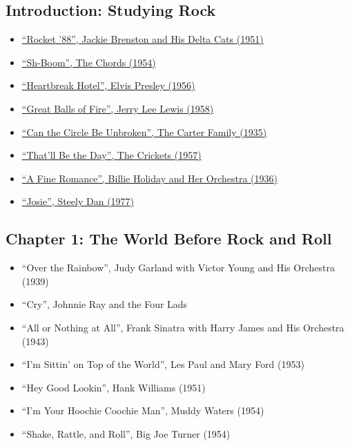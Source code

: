 \documentclass[12pt, a4paper]{book}
\begin{document}
\subsection*{Introduction: Studying Rock}
\begin{itemize}
    \item \href{https://music.apple.com/us/song/rocket-88-single-version/1452976168}{``Rocket '88'', Jackie Brenston and His Delta Cats (1951)}
    \item \href{https://music.apple.com/us/song/sh-boom-digitally-remastered/446469975}{``Sh-Boom'', The Chords (1954)}
    \item \href{https://music.apple.com/us/song/heartbreak-hotel/217633894}{``Heartbreak Hotel'', Elvis Presley (1956)}
    \item \href{https://music.apple.com/us/song/great-balls-of-fire/1443901152}{``Great Balls of Fire'', Jerry Lee Lewis (1958)}
    \item \href{https://music.apple.com/us/song/can-the-circle-be-unbroken/192774833}{``Can the Circle Be Unbroken'', The Carter Family (1935)}
    \item \href{https://music.apple.com/us/song/thatll-be-the-day/1469585905}{``That'll Be the Day'', The Crickets (1957)}
    \item \href{https://music.apple.com/us/song/a-fine-romance-78rpm-version/398981971}{``A Fine Romance'', Billie Holiday and Her Orchestra (1936)}
    \item \href{https://music.apple.com/us/song/josie/1706428474}{``Josie'', Steely Dan (1977)}
\end{itemize}


\subsection*{Chapter 1: The World Before Rock and Roll}
\begin{itemize}
    \item ``Over the Rainbow'', Judy Garland with Victor Young and His Orchestra (1939)
    \item ``Cry'', Johnnie Ray and the Four Lads
    \item ``All or Nothing at All'', Frank Sinatra with Harry James and His Orchestra (1943)
    \item ``I'm Sittin' on Top of the World'', Les Paul and Mary Ford (1953)
    \item ``Hey Good Lookin'', Hank Williams (1951)
    \item ``I'm Your Hoochie Coochie Man'', Muddy Waters (1954)
    \item ``Shake, Rattle, and Roll'', Big Joe Turner (1954)
\end{itemize}
\end{document}
